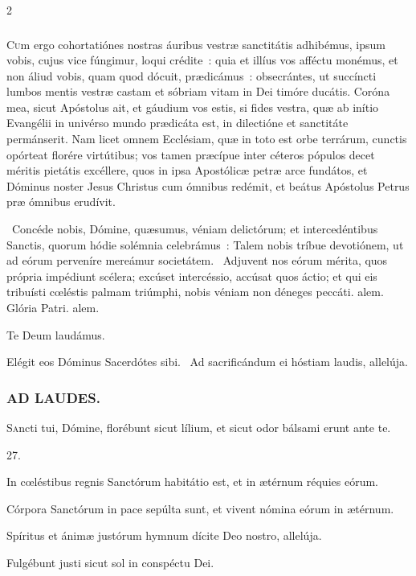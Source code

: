 \documentclass[9pt,twoside]{extarticle}
\begin{document}
\begin{multicols}{2}
\subsubsection*{\center {}}
\lettrine{C}um ergo cohortatiónes nostras áuribus vestræ sanctitátis adhibémus, ipsum vobis, cujus vice fúngimur, loqui crédite~: quia et illíus vos afféctu monémus, et non áliud vobis, quam quod dócuit, prædicámus~: obsecrántes, ut succíncti lumbos mentis vestræ castam et sóbriam vitam in Dei timóre ducátis. Coróna mea, sicut Apóstolus ait, et gáudium vos estis, si fides vestra, quæ ab inítio Evangélii in univérso mundo prædicáta est, in dilectióne et sanctitáte permánserit. Nam licet omnem Ecclésiam, quæ in toto est orbe terrárum, cunctis opórteat florére virtútibus; vos tamen præcípue inter céteros pópulos decet méritis pietátis excéllere, quos in ipsa Apostólicæ petræ arce fundátos, et Dóminus noster Jesus Christus cum ómnibus redémit, et beátus Apóstolus Petrus præ ómnibus erudívit.

\begin{tightlist}{}
\item {}~Concéde nobis, Dómine, quæsumus, véniam delictórum; et intercedéntibus Sanctis, quorum hódie solémnia celebrámus~: \textred{*} Talem nobis tríbue devotiónem, ut ad eórum perveníre mereámur societátem. ~Adjuvent nos eórum mérita, quos própria impédiunt scélera; excúset intercéssio, accúsat quos áctio; et qui eis tribuísti cœléstis palmam triúmphi, nobis véniam non déneges peccáti. alem. Glória Patri. alem.
\item Te Deum laudámus.
\item {} Elégit eos Dóminus Sacerdótes sibi. ~Ad sacrificándum ei hóstiam laudis, allelúja.
\end{tightlist}

\subsubsection*{\center \textsc{AD LAUDES.}}
\begin{center}\end{center}
\lettrine{S}ancti tui, Dómine, florébunt sicut lílium, et sicut odor bálsami erunt ante te.

\begin{tightlist}{}
\item {} 27.
\item {} In cœléstibus regnis Sanctórum habitátio est, et in ætérnum réquies eórum.
\item {} Córpora Sanctórum in pace sepúlta sunt, et vivent nómina eórum in ætérnum.
\item {} Spíritus et ánimæ justórum hymnum dícite Deo nostro, allelúja.
\item {} Fulgébunt justi sicut sol in conspéctu Dei.
\end{tightlist}


\end{multicols}
\end{document}
